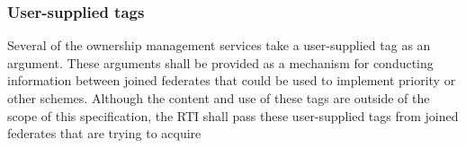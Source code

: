 \begin{compactstdpage}
    \subsubsection{User-supplied tags}


    Several of the ownership management services take a user-supplied tag as an argument. These arguments shall be provided as a mechanism for conducting information between joined federates that could be used to implement priority or other schemes. Although the content and use of these tags are outside of the scope of this specification, the RTI shall pass these user-supplied tags from joined federates that are trying to acquire

\end{compactstdpage}

\clearpage

